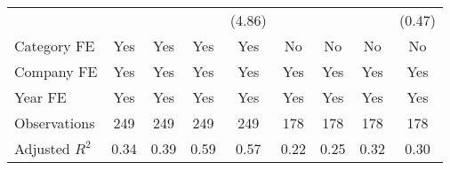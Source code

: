 {\begin{tabular}{l*{8}{c}}
                                   &                     &                     &                     &      (4.86)         &                     &                     &                     &      (0.47)         \\
[1em]
Category FE                        &         Yes         &         Yes         &         Yes         &         Yes         &          No         &          No         &          No         &          No         \\
[1em]
Company FE                         &         Yes         &         Yes         &         Yes         &         Yes         &         Yes         &         Yes         &         Yes         &         Yes         \\
[1em]
Year FE                            &         Yes         &         Yes         &         Yes         &         Yes         &         Yes         &         Yes         &         Yes         &         Yes         \\
\hline
Observations                       &         249         &         249         &         249         &         249         &         178         &         178         &         178         &         178         \\
Adjusted \(R^{2}\)                 &        0.34         &        0.39         &        0.59         &        0.57         &        0.22         &        0.25         &        0.32         &        0.30         \\
\hline\hline
\end{tabular}
}
